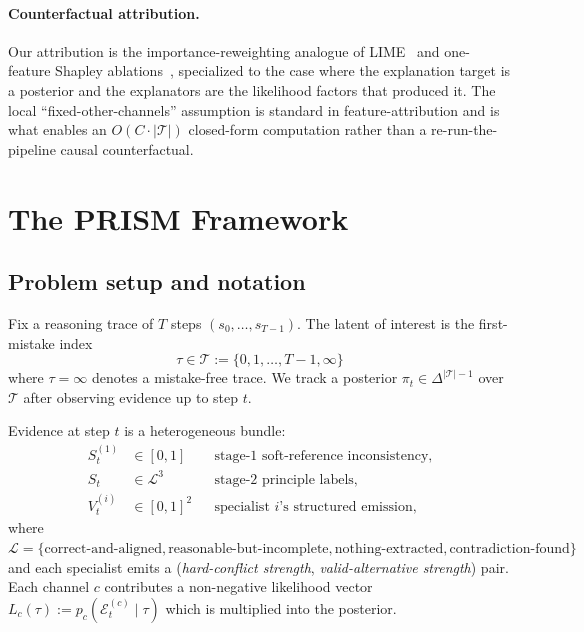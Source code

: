 \documentclass[11pt,a4paper]{article}
\newcommand{\Tcal}{\mathcal{T}}
\newcommand{\Lcal}{\mathcal{L}}
\newcommand{\Ecal}{\mathcal{E}}
\theoremstyle{plain}
\theoremstyle{definition}
\theoremstyle{remark}
\begin{document}
\paragraph{Counterfactual attribution.}
Our attribution is the importance-reweighting analogue of
LIME~\citep{ribeiro2016should} and one-feature Shapley
ablations~\citep{lundberg2017unified}, specialized to the case where
the explanation target is a posterior and the explanators are the
likelihood factors that produced it. The local
``fixed-other-channels'' assumption is standard in feature-attribution
and is what enables an $O(C \cdot |\Tcal|)$ closed-form computation
rather than a re-run-the-pipeline causal counterfactual.

\section{The PRISM Framework}
\label{sec:framework}

\subsection{Problem setup and notation}
\label{sec:notation}

Fix a reasoning trace of $T$ steps $(s_0,\dots,s_{T-1})$. The latent
of interest is the first-mistake index
\begin{equation}
\tau \in \Tcal := \{0,1,\dots,T-1,\infty\}
\end{equation}
where $\tau{=}\infty$ denotes a mistake-free trace. We track a
posterior $\pi_t \in \Delta^{|\Tcal|-1}$ over $\Tcal$ after observing
evidence up to step $t$.

Evidence at step $t$ is a heterogeneous bundle:
\begin{align*}
S_t^{(1)} &\in [0,1] && \text{stage-1 soft-reference inconsistency,}\\
S_t &\in \Lcal^3 && \text{stage-2 principle labels,}\\
V_t^{(i)} &\in [0,1]^2 && \text{specialist $i$'s structured emission,}
\end{align*}
where $\Lcal = \{\text{correct-and-aligned}, \text{reasonable-but-incomplete},
\text{nothing-extracted}, \text{contradiction-found}\}$ and each
specialist emits a (\emph{hard-conflict strength},
\emph{valid-alternative strength}) pair. Each channel $c$ contributes
a non-negative likelihood vector
$L_c(\tau) := p_c(\Ecal_t^{(c)} \mid \tau)$ which is multiplied into
the posterior.
\end{document}

